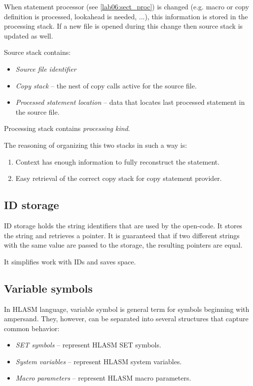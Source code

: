 When statement processor (see \cref{lab06:sect_proc}) is changed (e.g. macro or copy definition is processed, lookahead is needed, ...), this information is stored in the processing stack. If a new file is opened during this change then source stack is updated as well.

Source stack contains:
\begin{itemize}
	\item \emph{Source file identifier}
	\item \emph{Copy stack} -- the nest of copy calls active for the source file.
	\item \emph{Processed statement location} -- data that locates last processed statement in the source file.
\end{itemize}
Processing stack contains \emph{processing kind}.

The reasoning of organizing this two stacks in such a way is:
\begin{enumerate}
	\item Context has enough information to fully reconstruct the statement.
	\item Easy retrieval of the correct copy stack for copy statement provider.
\end{enumerate} 

\subsection{ID storage}

ID storage holds the string identifiers that are used by the open-code. 
It stores the string and retrieves a pointer. It is guaranteed that if two different strings with the same value are passed to the storage, the resulting pointers are equal.

It simplifies work with IDs and saves space. 

\subsection{Variable symbols}
\label{lab06:var_sym}

In HLASM language, variable symbol is general term for symbols beginning with ampersand. They, however, can be separated into several structures that capture common behavior:

\begin{itemize}
	\item \emph{SET symbols} -- represent HLASM SET symbols.
	\item \emph{System variables} -- represent HLASM system variables.
	\item \emph{Macro parameters} -- represent HLASM macro parameters.
\end{itemize}

